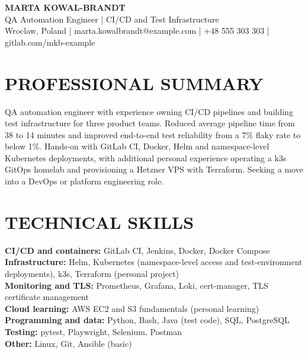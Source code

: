 \documentclass[11pt,a4paper]{article}
\begin{document}
\begin{center}
{\LARGE\bfseries\color{primarycolor} MARTA KOWAL-BRANDT}\\[0.25em]
{\large QA Automation Engineer | CI/CD and Test Infrastructure}\\[0.25em]
{\small Wroclaw, Poland | marta.kowalbrandt@example.com | +48 555 303 303 | gitlab.com/mkb-example}
\end{center}
\vspace{-0.4em}

\section*{PROFESSIONAL SUMMARY}
QA automation engineer with experience owning CI/CD pipelines and building test infrastructure for three product teams. Reduced average pipeline time from 38 to 14 minutes and improved end-to-end test reliability from a 7\% flaky rate to below 1\%. Hands-on with GitLab CI, Docker, Helm and namespace-level Kubernetes deployments, with additional personal experience operating a k3s GitOps homelab and provisioning a Hetzner VPS with Terraform. Seeking a move into a DevOps or platform engineering role.

\section*{TECHNICAL SKILLS}
\textbf{CI/CD and containers:} GitLab CI, Jenkins, Docker, Docker Compose\\
\textbf{Infrastructure:} Helm, Kubernetes (namespace-level access and test-environment deployments), k3s, Terraform (personal project)\\
\textbf{Monitoring and TLS:} Prometheus, Grafana, Loki, cert-manager, TLS certificate management\\
\textbf{Cloud learning:} AWS EC2 and S3 fundamentals (personal learning)\\
\textbf{Programming and data:} Python, Bash, Java (test code), SQL, PostgreSQL\\
\textbf{Testing:} pytest, Playwright, Selenium, Postman\\
\textbf{Other:} Linux, Git, Ansible (basic)
\end{document}
